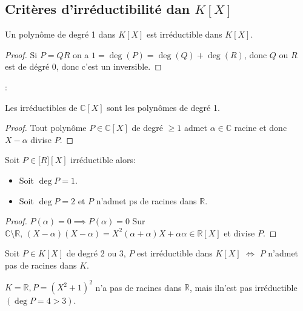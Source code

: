 \subsection{Critères d'irréductibilité dan $K[X]$}


\begin{prop}
	Un polynôme de degré 1 dans $K[X]$ est irréductible dans $K[X]$.
\end{prop}

\begin{proof}
	Si $P = QR$ on a $ 1 = \deg(P) = \deg(Q) + \deg(R)$, donc $Q$ ou $R$ est de dégré 0, donc c'est un inversible.
\end{proof}:


\begin{theorem}
	Les irréductibles de $\mathbb{C}[X]$ sont les polynômes de degré 1.
\end{theorem}


\begin{proof}
	Tout polynôme $P\in \mathbb{C}[X]$ de degré $\geq 1$ admet $\alpha \in \mathbb{C}$ racine et donc $X-\alpha$ divise $P$.
\end{proof}



\begin{prop}
	Soit $P \in \mathbb[R][X]$ irréductible alors:
	\begin{itemize}
		\item Soit $\deg P = 1$.
		\item Soit $\deg P = 2$ et $P$ n'admet ps de racines dans $\mathbb{R}$.
	\end{itemize}
\end{prop}


\begin{proof}
	$P(\alpha) = 0 \implies P(\alpha) = 0$ %
	Sur $\mathbb{C} \setminus \mathbb{R}, \, (X- \alpha) (X- \alpha) = X ^2(\alpha + \alpha)X + \alpha\alpha \in \mathbb{R}[X]$ %
	et divise $P$.
\end{proof}



\begin{prop}
	Soit $P \in K[X]$ de degré 2 ou 3,
	$P$ est irréductible dans $K[X]$ $\iff$ $P$ n'admet pas de racines dans $K$.
\end{prop}


\begin{exemple}
	$K = \mathbb{R}, P = (X^2 + 1 )^2$ n'a pas de racines dans $\mathbb{R}$, mais iln'est pas irréductible $(\deg P = 4 > 3)$.
\end{exemple}

